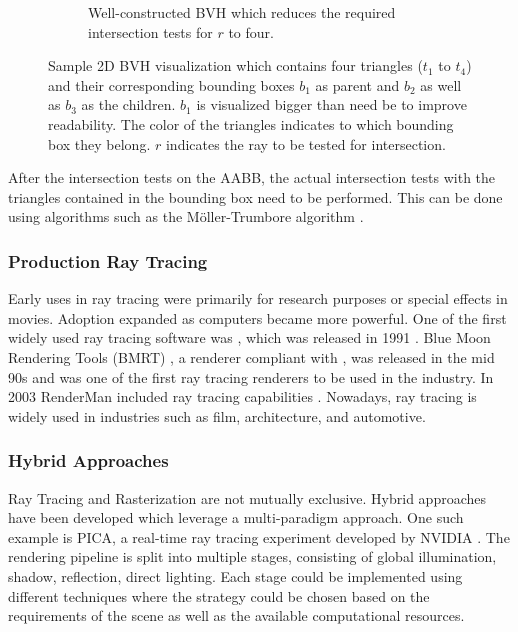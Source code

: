 \begin{figure}[H]
\begin{subfigure}[b]{0.45\textwidth}
    \caption{Well-constructed \gls{BVH} which reduces the required intersection tests for $r$ to four.}
    \label{fig:bvhGood}
  \end{subfigure}
  \caption{Sample 2D \gls{BVH} visualization which contains four triangles ($t_1$ to $t_4$) and their corresponding bounding boxes $b_1$ as parent and $b_2$ as well as $b_3$ as the children. $b_1$ is visualized bigger than need be to improve readability. The color of the triangles indicates to which bounding box they belong. $r$ indicates the ray to be tested for intersection.}
  \label{fig:bvhVisualized}
\end{figure}

After the intersection tests on the \gls{AABB}, the actual intersection tests with the triangles contained in the bounding box need to be performed. This can be done using algorithms such as the Möller-Trumbore algorithm \cite{mollerTrumboreFastRayTriangleIntersection}.

\subsubsection{Production Ray Tracing}

Early uses in ray tracing were primarily for research purposes or special effects in movies. Adoption expanded as computers became more powerful. One of the first widely used ray tracing software was , which was released in 1991 \cite{POV_Ray_Documentation}. Blue Moon Rendering Tools (\gls{BMRT}) \cite{bmrt}, a renderer compliant with , was released in the mid 90s and was one of the first ray tracing renderers to be used in the industry. In 2003 \gls{RenderMan} included ray tracing capabilities \cite{RenderMan_11_Release_Notes}. Nowadays, ray tracing is widely used in industries such as film, architecture, and automotive.

\subsubsection{Hybrid Approaches}

Ray Tracing and Rasterization are not mutually exclusive. Hybrid approaches have been developed which leverage a multi-paradigm approach. One such example is PICA, a real-time ray tracing experiment developed by NVIDIA \cite{hybridRenderingBarreBrisebois2019}. The rendering pipeline is split into multiple stages, consisting of global illumination, shadow, reflection, direct lighting. Each stage could be implemented using different techniques where the strategy could be chosen based on the requirements of the scene as well as the available computational resources.

